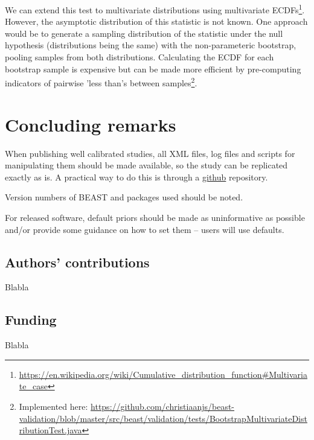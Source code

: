 \documentclass[oneside]{article}
\begin{document}
We can extend this test to multivariate distributions using multivariate ECDFs\footnote{\url{https://en.wikipedia.org/wiki/Cumulative_distribution_function\#Multivariate_case}}. However, the asymptotic distribution of this statistic is not known. One approach would be to generate a sampling distribution of the statistic under the null hypothesis (distributions being the same) with the non-parameteric bootstrap, pooling samples from both distributions. Calculating the ECDF for each bootstrap sample is expensive but can be made more efficient by pre-computing indicators of pairwise 'less than's between samples\footnote{Implemented here: \url{https://github.com/christiaanjs/beast-validation/blob/master/src/beast/validation/tests/BootstrapMultivariateDistributionTest.java}}.

\section*{Concluding remarks}

When publishing well calibrated studies, all XML files, log files and
scripts for manipulating them should be made available, so the study can
be replicated exactly as is. A practical way to do this is through a
\href{http://github.com}{github} repository.

Version numbers of BEAST and packages used should be noted.

For released software, default priors should be made as uninformative as 
possible and/or provide some guidance on how to set them -- users will use defaults.


\subsection*{Authors' contributions}
Blabla

\subsection*{Funding}
Blabla






\end{document}
